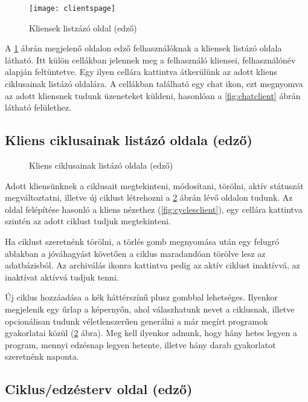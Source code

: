 \begin{figure}[H]
	\centering
	\texttt{[image: clientspage]}
	\caption{Kliensek listzázó oldal (edző)}
	\label{fig:clientspage}
\end{figure}

A \ref{fig:clientspage} ábrán megjelenő oldalon edző felhasználóknak a kliensek listázó oldala látható. Itt külön cellákban jelennek meg a felhasználó kliensei, felhasználónév alapján feltüntetve. Egy ilyen cellára kattintva átkerülünk az adott kliens ciklusainak listázó oldalára. A cellákban található egy chat ikon, ezt megnyomva az adott kliensnek tudunk üzeneteket küldeni, hasonlóan a \ref{fig:chatclient} ábrán látható felülethez.

\subsection{Kliens ciklusainak listázó oldala (edző)}

\begin{figure}[H]
	\centering
	\hspace{5pt}
	\caption{Kliens ciklusainak listázó oldala (edző)}
	\label{fig:clientpage}
\end{figure}

Adott kliensünknek a ciklusait megtekinteni, módosítani, törölni, aktív státuszát megváltoztatni, illetve új ciklust létrehozni a \ref{fig:clientpage} ábrán lévő oldalon tudunk. Az oldal felépítése hasonló a kliens nézethez (\ref{fig:cyclesclient}), egy cellára kattintva szintén az adott ciklust tudjuk megtekinteni.

Ha ciklust szeretnénk törölni, a törlés gomb megnyomása után egy felugró ablakban a jóváhagyást követően a ciklus maradandóan törölve lesz az adatbázisból. Az archiválás ikonra kattintva pedig az aktív ciklust inaktívvá, az inaktívat aktívvá tudjuk tenni.

Új ciklus hozzáadása a kék háttérszínű plusz gombbal lehetséges. Ilyenkor megjelenik egy űrlap a képernyőn, ahol válaszhatunk nevet a ciklusnak, illetve opcionálisan tudunk véletlenszerűen generálni a már megírt programok gyakorlatai közül (\ref{fig:clientpage} ábra). Meg kell ilyenkor adnunk, hogy hány hetes legyen a program, mennyi edzésnap legyen hetente, illetve hány darab gyakorlatot szeretnénk naponta.

\subsection{Ciklus/edzésterv oldal (edző)}

